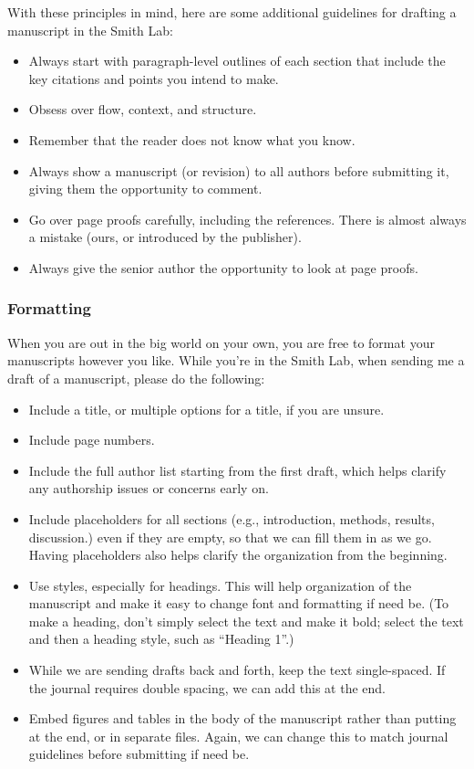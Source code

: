 \documentclass[letterpaper,11pt,oneside]{memoir}
\begin{document}
With these principles in mind, here are some additional guidelines for drafting a manuscript in the Smith Lab:

\begin{itemize}[noitemsep]
\item Always start with paragraph-level outlines of each section that include the key citations and points you intend to make.
\item Obsess over flow, context, and structure.
\item Remember that the reader does not know what you know.
\item Always show a manuscript (or revision) to all authors before submitting it, giving them the opportunity to comment.
\item Go over page proofs carefully, including the references. There is almost always a mistake (ours, or introduced by the publisher).
\item Always give the senior author the opportunity to look at page proofs.
\end{itemize}


\subsubsection{Formatting}

When you are out in the big world on your own, you are free to format your manuscripts however you like. While you're in the Smith Lab, when sending me a draft of a manuscript, please do the following:

\begin{itemize}[noitemsep]
\item Include a title, or multiple options for a title, if you are unsure. 
\item Include page numbers.
\item Include the full author list starting from the first draft, which helps clarify any authorship issues or concerns early on.
\item Include placeholders for all sections (e.g., introduction, methods, results, discussion.) even if they are empty, so that we can fill them in as we go. Having placeholders also helps clarify the organization from the beginning.
\item Use styles, especially for headings. This will help organization of the manuscript and make it easy to change font and formatting if need be. (To make a heading, don't simply select the text and make it bold; select the text and then a heading style, such as ``Heading 1''.)
\item While we are sending drafts back and forth, keep the text single-spaced. If the journal requires double spacing, we can add this at the end.
\item Embed figures and tables in the body of the manuscript rather than putting at the end, or in separate files. Again, we can change this to match journal guidelines before submitting if need be.
\end{itemize}
\end{document}
